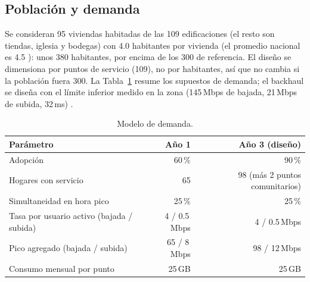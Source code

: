 \documentclass[11pt,a4paper]{article}
\begin{document}
\subsection{Población y demanda}
Se consideran 95 viviendas habitadas de las 109 edificaciones (el resto son tiendas, iglesia y bodegas) con 4.0 habitantes por vivienda (el promedio nacional es 4.5 \cite{F14}): unos 380 habitantes, por encima de los 300 de referencia. El diseño se dimensiona por puntos de servicio (109), no por habitantes, así que no cambia si la población fuera 300. La Tabla~\ref{tab:dem} resume los supuestos de demanda; el backhaul se diseña con el límite inferior medido en la zona (145\,Mbps de bajada, 21\,Mbps de subida, 32\,ms) \cite{F09,F11}.
\begin{table}[H]\centering\caption{Modelo de demanda.}\label{tab:dem}\small\begin{tabular}{lrr}\toprule Parámetro & Año 1 & Año 3 (diseño)\\\midrule Adopción & 60\,\% & 90\,\%\\ Hogares con servicio & 65 & 98 (más 2 puntos comunitarios)\\ Simultaneidad en hora pico & 25\,\% & 25\,\%\\ Tasa por usuario activo (bajada / subida) & 4 / 0.5\,Mbps & 4 / 0.5\,Mbps\\ Pico agregado (bajada / subida) & 65 / 8\,Mbps & 98 / 12\,Mbps\\ Consumo mensual por punto & 25\,GB & 25\,GB\\\bottomrule\end{tabular}\end{table}
\end{document}

